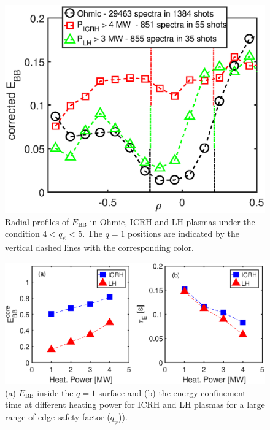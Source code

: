 \begin{figure}[h]
\begin{centering}
\includegraphics[scale=0.6]{fig_EBBc_ICRH_LH.eps}
\par\end{centering}
\caption{Radial profiles of $E_\mathrm{BB}$ in Ohmic, ICRH and LH plasmas under the condition $4 < q_{\psi} < 5$. The $q = 1$ positions are indicated by the vertical dashed lines with the corresponding color.}
\label{fig:EBBc_ICRH_LH}
\end{figure}


\begin{figure}[h]
\begin{centering}
\includegraphics[scale=0.6]{fig_EBB_diff_ICRH_LH.eps}
\par\end{centering}
\caption{(a) $E_\mathrm{BB}$ inside the $q = 1$ surface and (b) the energy confinement time at different heating power for ICRH and LH plasmas for a large range of edge safety factor ($q_{\psi}$)).}
\label{fig:EBB_diff_ICRH_LH}
\end{figure}


